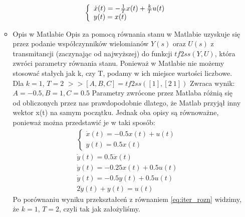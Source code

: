 \documentclass[a4paper,10pt]{article}
\begin{document}
\begin{itemize}
\begin{itemize}
\begin{eqnarray}
		\left\{ \begin{array}{l}
			\dot{x}(t) = -{1 \over T}x(t) + {k \over T}u(t)\\
			y(t) = x(t)
		\end{array} \right.
	\end{eqnarray}
\item Opis w Matlabie
\newline Opis za pomocą równania stanu w Matlabie uzyskuje się przez podanie współczynników wielomianów $Y(s)$ oraz $U(s)$ z transmitancji (zaczynając od najwyższej) do funkcji $tf2ss(Y, U)$, która zwróci parametry równania stanu.
Ponieważ w Matlabie nie możemy stosować stałych jak k, czy T, podamy w ich miejsce wartości liczbowe.
\newline\newline Dla $k=1$, $T=2$
\newline $>>[A,B,C] = tf2ss([1], [2 \ 1])$
\newline Zwraca wynik:
$A = -0.5, B = 1, C = 0.5$
\newline \newline Parametry zwrócone przez Matlaba różnią się od obliczonych przez nas prawdopodobnie dlatego, że Matlab przyjął inny wektor x(t) na samym początku. Jednak oba opisy są równoważne, ponieważ można przedstawić je w taki sposób:
		\begin{eqnarray}
		\nonumber \left\{ \begin{array}{l}
			\dot{x}(t) = -0.5x(t) + u(t)\\
			y(t) = 0.5x(t)
		\end{array} \right.\\
		\nonumber \dot{y}(t) = 0.5\dot{x}(t)\\
		\nonumber \dot{y}(t) = -0.25x(t) + 0.5u(t)\\
		\nonumber \dot{y}(t) = -0.5y(t) + 0.5u(t)\\
		2\dot{y}(t) + y(t) = u(t)
	\end{eqnarray}
Po porównaniu wyniku przekształceń z równaniem \ref{eq:iter_rozn} widzimy, że $k=1$, $T=2$, czyli tak jak założyliśmy.

\end{itemize}


\end{itemize}
\end{document}
